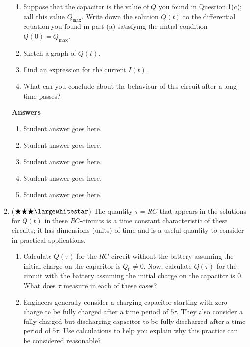 \documentclass{article}
\begin{document}
\begin{enumerate}
\begin{enumerate}
\item Suppose that the capacitor is the value of $Q$ you found in Question 1(c); call this value $Q_{\max}$. Write down the solution $Q(t)$ to the differential equation you found in part (a) satisfying the initial condition $Q(0) = Q_{\max}$.

\item Sketch a graph of $Q(t)$.

\item Find an expression for the current $I(t)$.  

\item What can you conclude about the behaviour of this circuit after a long time passes?

\end{enumerate}



\color{blue}
\textbf{Answers}
\begin{enumerate}
    \item Student answer goes here.
    \item Student answer goes here.
    \item Student answer goes here.
    \item Student answer goes here.
    \item Student answer goes here.
\end{enumerate}
\color{black}

\item ($\bigstar\bigstar\bigstar\largewhitestar$) The quantity $\tau = RC$ that appears in the solutions for $Q(t)$ in these $RC$-circuits is a time constant characteristic of these circuits; it has dimensions (units) of time and is a useful quantity to consider in practical applications.

\begin{enumerate}
    \item Calculate $Q(\tau)$ for the $RC$ circuit without the battery assuming the initial charge on the capacitor is $Q_0 \neq 0$.  Now, calculate $Q(\tau)$ for the circuit with the battery assuming the initial charge on the capacitor is 0.  What does $\tau$ measure in each of these cases?

    \item Engineers generally consider a charging capacitor starting with zero charge to be fully charged after a time period of $5\tau$.  They also consider a fully charged but discharging capacitor to be fully discharged after a time period of $5\tau$. Use calculations to help you explain why this practice can be considered reasonable?


\end{enumerate}
\end{enumerate}
\end{document}
